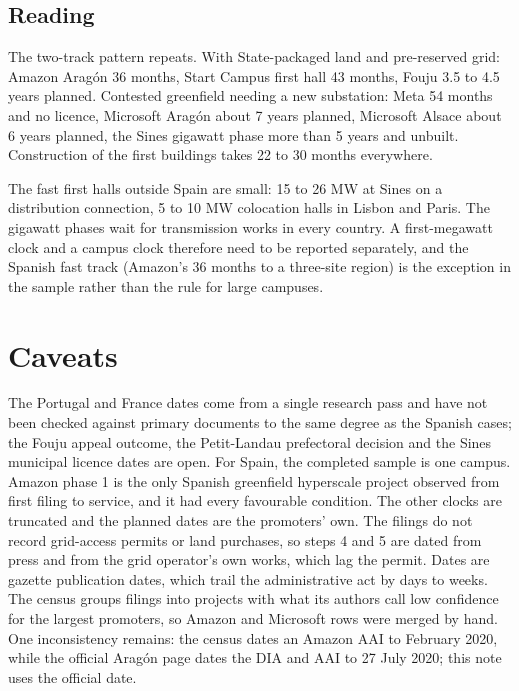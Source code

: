 \documentclass[11pt]{article}
\begin{document}
\subsection{Reading}

The two-track pattern repeats. With State-packaged land and pre-reserved grid: Amazon Aragón 36 months, Start Campus first hall 43 months, Fouju 3.5 to 4.5 years planned. Contested greenfield needing a new substation: Meta 54 months and no licence, Microsoft Aragón about 7 years planned, Microsoft Alsace about 6 years planned, the Sines gigawatt phase more than 5 years and unbuilt. Construction of the first buildings takes 22 to 30 months everywhere.

The fast first halls outside Spain are small: 15 to 26 MW at Sines on a distribution connection, 5 to 10 MW colocation halls in Lisbon and Paris. The gigawatt phases wait for transmission works in every country. A first-megawatt clock and a campus clock therefore need to be reported separately, and the Spanish fast track (Amazon's 36 months to a three-site region) is the exception in the sample rather than the rule for large campuses.

\section{Caveats}

The Portugal and France dates come from a single research pass and have not been checked against primary documents to the same degree as the Spanish cases; the Fouju appeal outcome, the Petit-Landau prefectoral decision and the Sines municipal licence dates are open. For Spain, the completed sample is one campus. Amazon phase 1 is the only Spanish greenfield hyperscale project observed from first filing to service, and it had every favourable condition. The other clocks are truncated and the planned dates are the promoters' own. The filings do not record grid-access permits or land purchases, so steps 4 and 5 are dated from press and from the grid operator's own works, which lag the permit. Dates are gazette publication dates, which trail the administrative act by days to weeks. The census groups filings into projects with what its authors call low confidence for the largest promoters, so Amazon and Microsoft rows were merged by hand. One inconsistency remains: the census dates an Amazon AAI to February 2020, while the official Aragón page dates the DIA and AAI to 27 July 2020; this note uses the official date.

\appendix
\end{document}
